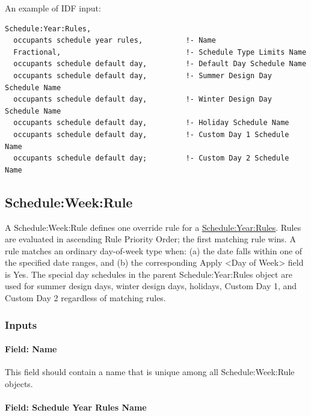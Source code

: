 An example of IDF input:

\begin{lstlisting}
Schedule:Year:Rules,
  occupants schedule year rules,          !- Name
  Fractional,                             !- Schedule Type Limits Name
  occupants schedule default day,         !- Default Day Schedule Name
  occupants schedule default day,         !- Summer Design Day Schedule Name
  occupants schedule default day,         !- Winter Design Day Schedule Name
  occupants schedule default day,         !- Holiday Schedule Name
  occupants schedule default day,         !- Custom Day 1 Schedule Name
  occupants schedule default day;         !- Custom Day 2 Schedule Name
\end{lstlisting}

\subsection{Schedule:Week:Rule}\label{scheduleweekrule}

A Schedule:Week:Rule defines one override rule for a \hyperref[scheduleyearrules]{Schedule:Year:Rules}.
Rules are evaluated in ascending Rule Priority Order; the first matching rule wins.
A rule matches an ordinary day-of-week type when: (a) the date falls within one of the specified date ranges, and (b) the corresponding Apply \textless{}Day of Week\textgreater{} field is Yes.
The special day schedules in the parent Schedule:Year:Rules object are used for summer design days, winter design days, holidays, Custom Day 1, and Custom Day 2 regardless of matching rules.

\subsubsection{Inputs}\label{inputs-scheduleweekrule}

\paragraph{Field: Name}\label{field-name-scheduleweekrule}

This field should contain a name that is unique among all Schedule:Week:Rule objects.

\paragraph{Field: Schedule Year Rules Name}\label{field-schedule-year-rules-name-scheduleweekrule}

